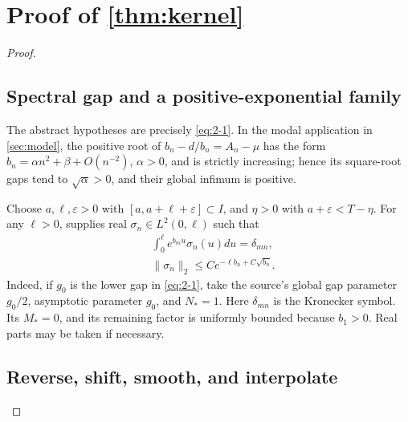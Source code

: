 \section{Proof of \cref{thm:kernel}}\label{sec:proof}
\begin{proof}
\subsection{Spectral gap and a positive-exponential family}\label{subsec:gap}

The abstract hypotheses are precisely \eqref{eq:2-1}. In the modal application in \cref{sec:model}, the positive root of \(b_n-d/b_n=A_n-\mu\) has the form \(b_n=\alpha n^2+\beta+O(n^{-2})\), \(\alpha>0\), and is strictly increasing; hence its square-root gaps tend to \(\sqrt\alpha>0\), and their global infimum is positive.

Choose \(a,\ell,\varepsilon>0\) with \([a,a+\ell+\varepsilon]\subset I\), and \(\eta>0\) with \(a+\varepsilon<T-\eta\). For any \(\ell>0\), \cite[Theorem~2.1]{Cannarsa2020} supplies real \(\sigma_n\in L^2(0,\ell)\) such that
\begin{equation}\label{eq:3-1}
\begin{aligned}
&\int_0^\ell e^{b_m u}\sigma_n(u)du=\delta_{mn},\\
&
\|\sigma_n\|_2\le C e^{-\ell b_n+C\sqrt{b_n}}.
\end{aligned}
\end{equation}
Indeed, if \(g_0\) is the lower gap in \eqref{eq:2-1}, take the source's global gap parameter \(g_0/2\), asymptotic parameter \(g_0\), and \(N_*=1\). Here \(\delta_{mn}\) is the Kronecker symbol. Its \(M_*=0\), and its remaining factor is uniformly bounded because \(b_1>0\). Real parts may be taken if necessary.

\subsection{Reverse, shift, smooth, and interpolate}


\end{proof}
